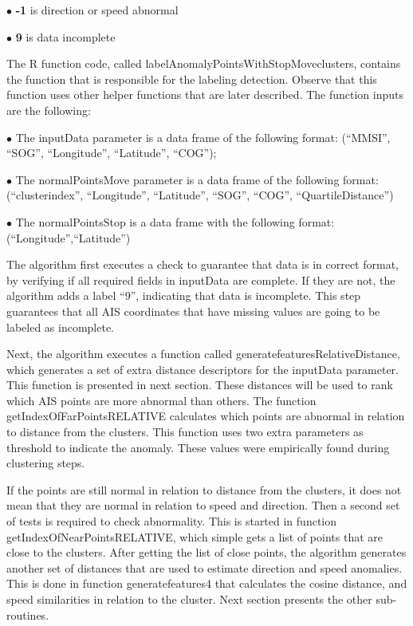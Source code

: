\documentclass[12pt,glossary]{dalcsthesis}
\begin{document}
$\bullet$ \textbf{-1} is direction or speed abnormal

$\bullet$ \textbf{9} is data incomplete

The R function code, called labelAnomalyPointsWithStopMoveclusters, contains the function that is responsible for the labeling detection. Observe that this function uses other helper functions that are later described. The function inputs are the following:

$\bullet$ The inputData parameter is a data frame of the following format: (``MMSI'', ``SOG'', ``Longitude'', ``Latitude'', ``COG'');

$\bullet$ The normalPointsMove parameter is a data frame of the following format: (``clusterindex'', ``Longitude'', ``Latitude'', ``SOG'', ``COG'', ``QuartileDistance'')

$\bullet$ The normalPointsStop is a data frame with the following format: (``Longitude'',``Latitude'')

The algorithm first executes a check to guarantee that data is in correct format, by verifying if all required fields in inputData are complete. If they are not, the algorithm adds a label “9”, indicating that data is incomplete. This step guarantees that all AIS coordinates that have missing values are going to be labeled as incomplete. 

Next, the algorithm executes a function called generatefeaturesRelativeDistance, which generates a set of extra distance descriptors for the inputData parameter. This function is presented in next section. These distances will be used to rank which AIS points are more abnormal than others.  The function getIndexOfFarPointsRELATIVE calculates which points are abnormal in relation to distance from the clusters.  This function uses two extra parameters as threshold to indicate the anomaly. These values were empirically found during clustering steps.

If the points are still normal in relation to distance from the clusters, it does not mean that they are normal in relation to speed and direction. Then a second set of tests is required to check abnormality. This is started in function getIndexOfNearPointsRELATIVE, which simple gets a list of points that are close to the clusters. After getting the list of close points, the algorithm generates another set of distances that are used to estimate direction and speed anomalies. This is done in function generatefeatures4 that calculates the cosine distance, and speed similarities in relation to the cluster.  Next section presents the other sub-routines.


\end{document}
